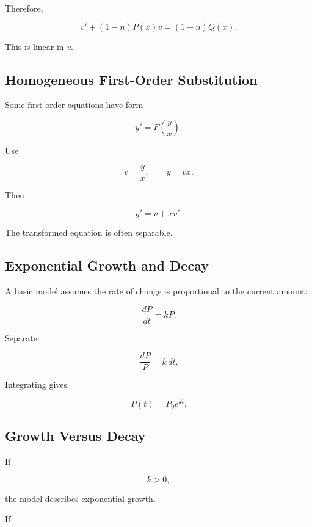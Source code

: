 Therefore,

\[
\boxed{
v'
+
(1-n)P(x)v
=
(1-n)Q(x).
}
\]

This is linear in \(v\).

\subsection{Homogeneous First-Order Substitution}
\label{subsec:homogeneous-first-order-substitution}

Some first-order equations have form

\[
\boxed{
y'
=
F
\left(
\frac{y}{x}
\right).
}
\]

Use

\[
\boxed{
v
=
\frac{y}{x},
\qquad
y=vx.
}
\]

Then

\[
\boxed{
y'
=
v
+
xv'.
}
\]

The transformed equation is often separable.

\subsection{Exponential Growth and Decay}
\label{subsec:exponential-growth-decay}

A basic model assumes the rate of change is proportional to the current
amount:

\[
\boxed{
\frac{dP}{dt}
=
kP.
}
\]

Separate:

\[
\frac{dP}{P}
=
k\,dt.
\]

Integrating gives

\[
\boxed{
P(t)
=
P_0e^{kt}.
}
\]

\subsection{Growth Versus Decay}
\label{subsec:growth-versus-decay}

If

\[
\boxed{
k>0,
}
\]

the model describes exponential growth.

If

